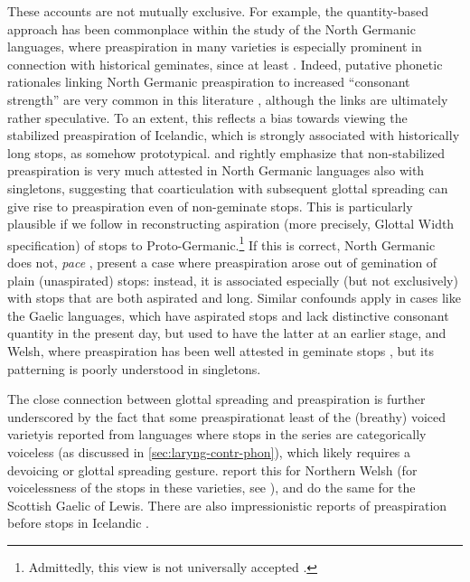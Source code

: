 \documentclass[output=paper,colorlinks,citecolor=brown]{langscibook}
\begin{document}
These accounts are not mutually exclusive. For example, the quantity\hyp based approach has been commonplace within the study of the North Germanic languages, where preaspiration in many varieties is especially prominent in connection with historical geminates, since at least \textcite{marstrander1932okklusiver}. Indeed, putative phonetic rationales linking North Germanic preaspiration to increased \enquote{consonant strength} are very common in this literature \parencite[e.\,g.][]{naert1969}, although the links are ultimately rather speculative. To an extent, this reflects a bias towards viewing the stabilized preaspiration of Icelandic, which is strongly associated with historically long {\VOICELESS} stops, as somehow prototypical. \textcite{hansson2001remains} and \textcite{helgason} rightly emphasize that non\hyp stabilized preaspiration is very much attested in North Germanic languages also with singletons, suggesting that coarticulation with subsequent glottal spreading can give rise to preaspiration even of non\hyp geminate stops. This is particularly plausible if we follow \textcite{iverson99:_laryn_german, salmons2017germanic} in reconstructing aspiration (more precisely, Glottal Width specification) of {\VOICELESS} stops to Proto\hyp Germanic.\footnote{Admittedly, this view is not universally accepted \parencite{steblin, goblirsch2005lautverschiebungen}.} If this is correct, North Germanic does not, \emph{pace} \textcite{blevins1993ponapeic}, present a case where preaspiration arose out of gemination of plain (unaspirated) stops: instead, it is associated especially (but not exclusively) with stops that are both aspirated and long. Similar confounds apply in cases like the Gaelic languages, which have aspirated {\VOICELESS} stops and lack distinctive consonant quantity in the present day, but used to have the latter at an earlier stage, and Welsh, where preaspiration has been well attested in geminate {\VOICELESS} stops \parencite{morris2017linguistic}, but its patterning is poorly understood in singletons.

The close connection between glottal spreading and preaspiration is further underscored by the fact that some preaspiration\dash at least of the (breathy) voiced variety\dash is reported from languages where stops in the {\VOICED} series are categorically voiceless (as discussed in \cref{sec:laryng-contr-phon}), which likely requires a devoicing or glottal spreading gesture. \Textcite{morris2017linguistic} report this for Northern Welsh (for voicelessness of the {\VOICED} stops in these varieties, see \citealt{bell2021northern}), and \textcite{nance2013pre} do the same for the Scottish Gaelic of Lewis. There are also impressionistic reports of preaspiration before {\VOICED} stops in Icelandic \parencite[571--572]{einarsson1932icelandic}.
\end{document}
